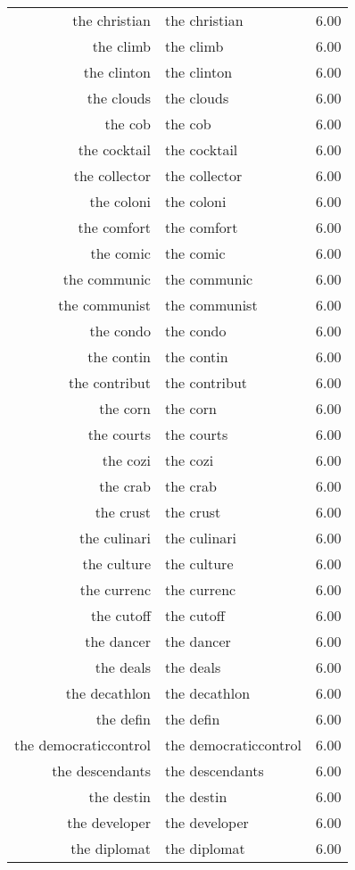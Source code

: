 \begin{table}[ht]
\begin{tabular}{rlr}
  the christian & the christian & 6.00 \\ 
  the climb & the climb & 6.00 \\ 
  the clinton & the clinton & 6.00 \\ 
  the clouds & the clouds & 6.00 \\ 
  the cob & the cob & 6.00 \\ 
  the cocktail & the cocktail & 6.00 \\ 
  the collector & the collector & 6.00 \\ 
  the coloni & the coloni & 6.00 \\ 
  the comfort & the comfort & 6.00 \\ 
  the comic & the comic & 6.00 \\ 
  the communic & the communic & 6.00 \\ 
  the communist & the communist & 6.00 \\ 
  the condo & the condo & 6.00 \\ 
  the contin & the contin & 6.00 \\ 
  the contribut & the contribut & 6.00 \\ 
  the corn & the corn & 6.00 \\ 
  the courts & the courts & 6.00 \\ 
  the cozi & the cozi & 6.00 \\ 
  the crab & the crab & 6.00 \\ 
  the crust & the crust & 6.00 \\ 
  the culinari & the culinari & 6.00 \\ 
  the culture & the culture & 6.00 \\ 
  the currenc & the currenc & 6.00 \\ 
  the cutoff & the cutoff & 6.00 \\ 
  the dancer & the dancer & 6.00 \\ 
  the deals & the deals & 6.00 \\ 
  the decathlon & the decathlon & 6.00 \\ 
  the defin & the defin & 6.00 \\ 
  the democraticcontrol & the democraticcontrol & 6.00 \\ 
  the descendants & the descendants & 6.00 \\ 
  the destin & the destin & 6.00 \\ 
  the developer & the developer & 6.00 \\ 
  the diplomat & the diplomat & 6.00 \\ 

\end{tabular}
\end{table}
